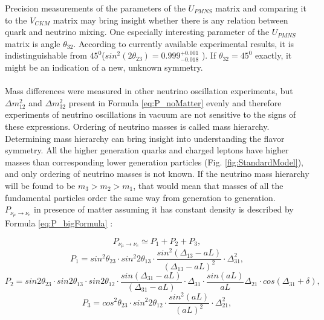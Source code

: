 Precision measurements of the parameters of the $U_{PMNS}$ matrix and comparing it to the $V_{CKM}$ matrix may bring insight whether there is any relation between quark and neutrino mixing. One especially interesting parameter of the $U_{PMNS}$ matrix is angle $\theta_{32}$. According to currently available experimental results, it is indistinguishable from $45^0$($sin^2(2\theta_{23})=0.999^{+0.001}_{-0.018}$ \cite{ref_PDG}). If $\theta_{32}=45^0$ exactly, it might be an indication of a new, unknown symmetry.\\ \\
Mass differences were measured in other neutrino oscillation experiments, but ${\Delta}m_{12}^2$ and ${\Delta}m_{32}^2$ present in Formula \ref{eq:P_noMatter} evenly and therefore experiments of neutrino oscillations in vacuum are not sensitive to the signs of these expressions. Ordering of neutrino masses is called mass hierarchy. Determining mass hierarchy can bring insight into understanding the flavor symmetry. All the higher generation quarks and charged leptons have higher masses than corresponding lower generation particles (Fig. \ref{fig:StandardModel}), and only ordering of neutrino masses is not known. If the neutrino mass hierarchy will be found to be $m_3>m_2>m_1$, that would mean that masses of all the fundamental particles order the same way from generation to generation. \\
$P_{\nu_\mu \rightarrow \nu_e}$ in presence of matter assuming it has constant density is described by Formula \ref{eq:P_bigFormula} \cite{ref_theory_Osc}: \\
\begin{center}
\begin{equation}
\label{eq:P_bigFormula}
P_{\nu_\mu \rightarrow \nu_e} \simeq P_1 + P_2 + P_3, 
\end{equation}
\begin{equation}
\label{eq:P_bigFormula_1}
P_1 = sin^2{\theta_{23}} \cdot sin^2{2\theta_{13}} \cdot \frac{sin^2(\Delta_{13}-aL)}{(\Delta_{13}-aL)^2} \cdot \Delta^2_{31},
\end{equation}
\begin{equation}
\label{eq:P_bigFormula_2}
P_2 = sin2\theta_{23} \cdot sin2\theta_{13} \cdot sin2\theta_{12} \cdot \frac{sin(\Delta_{31}-aL)}{(\Delta_{31}-aL)} \cdot \Delta_{31} \cdot \frac{sin(aL)}{aL}\Delta_{21} \cdot cos(\Delta_{31}+\delta),
\end{equation}
\begin{equation}
\label{eq:P_bigFormula_3}
P_3 = cos^2\theta_{23} \cdot sin^2{2\theta_{12}} \cdot \frac{sin^2(aL)}{(aL)^2} \cdot \Delta^2_{21},
\end{equation}
\end{center}

